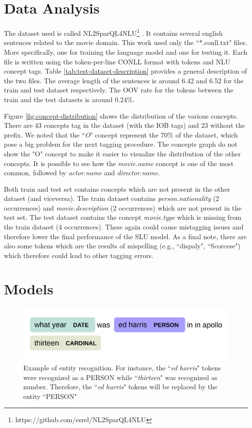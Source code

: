\documentclass[11pt,a4paper]{article}
\begin{document}
\section{Data Analysis}

The dataset used is called NL2SparQL4NLU\footnote{https://github.com/esrel/NL2SparQL4NLU} \citep{Chen2014DerivingLR, gobbi2018concept}. It contains several english sentences related to the movie domain. This work used only the ``*.conll.txt" files. More specifically, one for training the language model and one for testing it. Each file is written using the token-per-line CONLL format with tokens and NLU concept tags. Table \ref{tab:test-dataset-description} provides a general description of the two files. The average length of the sentences is around 6.42 and 6.52 for the train and test dataset respectively. The OOV rate for the tokens between the train and the test datasets is around $0.24\%$.


Figure \ref{fig:concept-distribution} shows the distribution of the various concepts. There are 43 concepts tag in the dataset (with the IOB tags) and 23 without the prefix. We noted that the ``\textit{O}" concept represent the $70\%$ of the dataset, which pose a big problem for the next tagging procedure. The concepts graph do not show the "O" concept to make it easier to visualize the distribution of the other concepts. It is possible to see how the \textit{movie.name} concept is one of the most common, followed by \textit{actor.name} and \textit{director.name}.

Both train and test set contains concepts which are not present in the other dataset (and viceversa). The train dataset contains \textit{person.nationality} (2 occurrences) and \textit{movie.description} (2 occurrences) which are not present in the test set. The test dataset contains the concept \textit{movie.type} which is missing from the train dataset (4 occurrences). These again could cause mistagging issues and therefore lower the final performance of the SLU model. 
As a final note, there are also
some tokens which are the results of mispelling (e.g., ``dispaly", ``Scorcese") which therefore could lead to other tagging errors.


\section{Models}

\begin{figure}[b!]
\centering
	\includegraphics[width=1\linewidth]{img/entity}
	\caption{Example of entity recognition. For instance, the ``\textit{ed harris}" tokens were recognized as a PERSON while ``\textit{thirteen}" was recognized as number. Therefore, the ``\textit{ed harris}" tokens will be replaced by the entity ``PERSON"}
	\label{fig:entity-recognition}
\end{figure}
\end{document}
